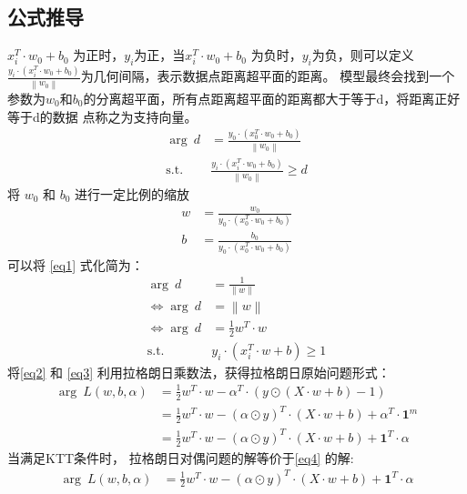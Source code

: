 \documentclass[12pt, a4paper, oneside]{ctexart}
\begin{document}
\subsection{公式推导}
$x_i^T \cdot w_0 + b_0$ 为正时，$y_i$为正，当$x_i^T \cdot w_0 + b_0$ 为负时，$y_i$为负，则可以定义
$\frac{y_i \cdot (x_i^T \cdot w_0 + b_0)}{ \left\|w_0\right\|}$为几何间隔，表示数据点距离超平面的距离。
模型最终会找到一个参数为$w_0$和$b_0$的分离超平面，所有点距离超平面的距离都大于等于d，将距离正好等于d的数据
点称之为支持向量。
\begin{align}
    \mathop{\arg\max_{w_0, b_0}} \ d &= \frac{y_0 \cdot (x_0^T \cdot w_0 + b_0)}{ \left\|w_0\right\|} 			\label{eq1}\\
	\mathrm{ s.t. }\ \   &\frac{y_i \cdot (x_i^T \cdot w_0 + b_0)}{ \left\|w_0\right\|} \geq d				\nonumber
\end{align}
将 $w_0$ 和 $b_0$ 进行一定比例的缩放
\begin{align}
	w &= \frac{w_0 }{ y_0 \cdot (x_0^T \cdot w_0 + b_0)} 			\nonumber\\
    b &= \frac{b_0 }{ y_0 \cdot (x_0^T \cdot w_0 + b_0)} 			\nonumber
\end{align}
可以将 \eqref{eq1} 式化简为：
\begin{align}
	\mathop{\arg\max_{w}} \ d &= \frac{1}{ \left\|w\right\|} 			\nonumber\\
    \Leftrightarrow   \mathop{\arg\min_{w}}  \ d &=  \left\|w\right\| \nonumber\\
    \Leftrightarrow   \mathop{\arg\min_{w}}  \ d &=  \frac{1}{2}w^T \cdot w \label{eq2}\\
    \mathrm{ s.t. }\ \   & y_i \cdot (x_i^T \cdot w + b) \geq 1				\label{eq3}
\end{align}
将\eqref{eq2} 和 \eqref{eq3} 利用拉格朗日乘数法，获得拉格朗日原始问题形式：
\begin{align}
    \mathop{\arg\min_{w,b}\max_{\alpha}} \ 	L(w, b, {\alpha}) &= \frac{1}{2}	w^T \cdot w  - {\alpha} ^T \cdot  (y \odot (X \cdot w + b) - 1) \nonumber\\
        &= \frac{1}{2}	w^T \cdot w  - (\alpha \odot y) ^T \cdot  (X \cdot w + b) + \alpha^T \cdot \boldsymbol{1}^m \nonumber\\
        &= \frac{1}{2}	w^T \cdot w  - (\alpha \odot y) ^T \cdot  (X \cdot w + b) + \boldsymbol{1}^T\cdot\alpha \label{eq4}
\end{align}
当满足KTT条件时， 拉格朗日对偶问题的解等价于\eqref{eq4} 的解:
\begin{align}
    \mathop{\arg\max_{\alpha}\min_{w,b}} \ 	L(w, b, {\alpha}) &= \frac{1}{2}	w^T \cdot w  - (\alpha \odot y) ^T \cdot  (X \cdot w + b) + \boldsymbol{1}^T\cdot\alpha \label{eq5}
\end{align}
\end{document}
